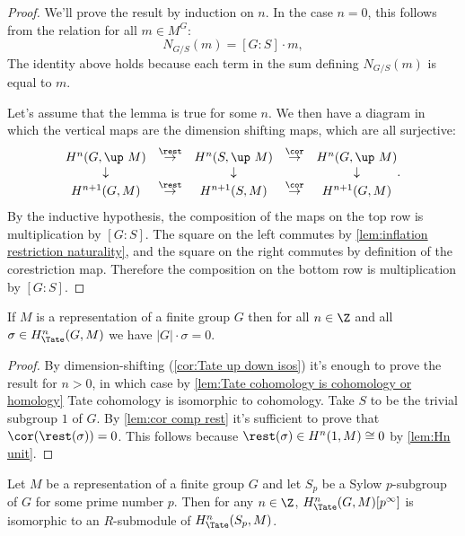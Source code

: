 \begin{proof}
	We'll prove the result by induction on $n$.
	In the case $n = 0$, this follows from the relation for all $m \in M^G$:
	\[
		N_{G/S} (m) = [G:S] \cdot m,
	\]
	The identity above holds because each term in the sum defining $N_{G/S}(m)$ is equal to $m$.

	Let's assume that the lemma is true for some $n$.
	We then have a diagram in which the vertical maps are the dimension shifting maps,
	which are all surjective:
	\[
		\begin{matrix}
			H^{n}(G,\up\ M) &  \stackrel{\rest}\to &
			H^{n}(S,\up\ M) &  \stackrel{\cor}\to & H^{n}(G,\up\ M)\\
			\downarrow &&\downarrow &&\downarrow \\
			H^{n+1}(G, M) & \stackrel{\rest}\to &
			H^{n+1}(S,M) & \stackrel{\cor}\to & H^{n+1}(G,M)
		\end{matrix}.
	\]
	By the inductive hypothesis,
	the composition of the maps on the top row is multiplication by $[G:S]$.
	The square on the left commutes by \ref{lem:inflation restriction naturality},
	and the square on the right commutes by definition of the corestriction map.
	Therefore the composition on the bottom row is multiplication by $[G:S]$.
\end{proof}


\begin{corollary} \label{cor:cohomology G-torsion}
	If $M$ is a representation of a finite group $G$ then for
	all $n \in \Z$ and all $\sigma \in H^n_{\Tate}(G,M)$ we have $|G| \cdot \sigma = 0$.
\end{corollary}

\begin{proof}
	By dimension-shifting (\ref{cor:Tate up down isos}) it's enough to prove the result for $n > 0$,
	in which case by \ref{lem:Tate cohomology is cohomology or homology}
	Tate cohomology is isomorphic to cohomology.
	Take $S$ to be the trivial subgroup $1$ of $G$.
	By \ref{lem:cor comp rest} it's sufficient to prove that $\cor(\rest(\sigma))= 0$.
	This follows because $\rest(\sigma) \in H^n(1,M) \cong 0$ by \ref{lem:Hn unit}.
\end{proof}

\begin{corollary} \label{cor:cohomology sub Sylow}
	Let $M$ be a representation of a finite group $G$ and let $S_p$ be a Sylow $p$-subgroup of $G$
	for some prime number $p$.
	Then for any $n \in \Z$, $H^n_{\Tate}(G,M)[p^\infty]$ is isomorphic to an $R$-submodule
	of $H^n_{\Tate}(S_p,M)$.
\end{corollary}

